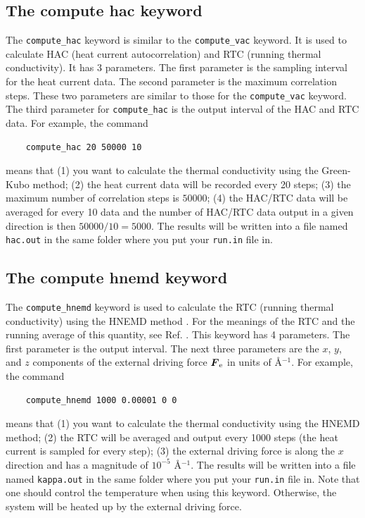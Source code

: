 \documentclass[12pt,a4paper]{report}
\newcommand{\vect}[1]{\boldsymbol{#1}}
\begin{document}
\subsection{The compute hac keyword}

The \verb"compute_hac" keyword is similar to the \verb"compute_vac" keyword. It is used to calculate HAC (heat current autocorrelation) and RTC (running thermal conductivity).
It has 3 parameters. The first parameter is the sampling interval for the heat current data. The second parameter is the maximum correlation steps. These two parameters are similar to those for the \verb"compute_vac" keyword. The third parameter for \verb"compute_hac" is the output interval of the HAC and RTC data. For example, the command
\begin{verbatim}
    compute_hac 20 50000 10
\end{verbatim}
means that (1) you want to calculate the thermal conductivity using the Green-Kubo method; (2) the heat current data will be recorded every 20 steps; (3) the maximum number of correlation steps is $50000$; (4) the HAC/RTC data will be averaged for every 10 data and the number of HAC/RTC data output in a given direction is then $50000/10=5000$. The results will be written into a file named \verb"hac.out" in the same folder where you put your \verb"run.in" file in.


\subsection{The compute hnemd keyword}

The \verb"compute_hnemd" keyword is used to calculate the RTC (running thermal conductivity) using the HNEMD method \cite{fan2018submitted}. For the meanings of the RTC and the running average of this quantity, see Ref. \cite{fan2018submitted}. This keyword has 4 parameters. The first parameter is the output interval. The next three parameters are the $x$, $y$, and $z$ components of the external driving force $\vect{F}_{\rm e}$ in units of \AA$^{-1}$. For example, the command
\begin{verbatim}
    compute_hnemd 1000 0.00001 0 0
\end{verbatim}
means that (1) you want to calculate the thermal conductivity using the HNEMD method; (2) the RTC will be averaged and output every 1000 steps (the heat current is sampled for every step); (3) the external driving force is along the $x$ direction and has a magnitude of $10^{-5}$ \AA$^{-1}$. The results will be written into a file named \verb"kappa.out" in the same folder where you put your \verb"run.in" file in. Note that one should control the temperature when using this keyword. Otherwise, the system will be heated up by the external driving force. 
\end{document}
